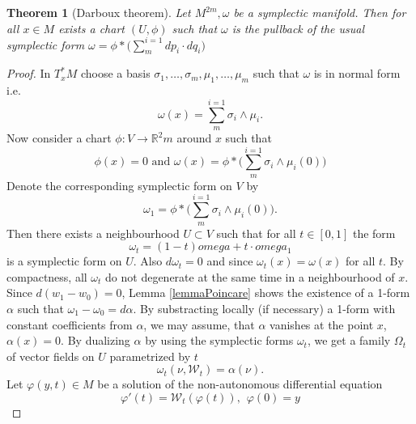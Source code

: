 \documentclass{article}
\newtheorem{theorem}{Theorem}
\theoremstyle{definition}
\begin{document}
\begin{theorem}[Darboux theorem]
    Let $M^{2m}, \omega$ be a symplectic manifold. Then for all $x \in M$ exists a chart $(U,\phi)$ such that $\omega$ is the pullback of the usual symplectic form $\omega = \phi*\Big(\sum_{m}^{i=1} dp_i \cdot dq_i \Big)$ 
\end{theorem}
\begin{proof}
    In $T^*_xM$ choose a basis $\sigma_1, \dots, \sigma_m, \mu_1, \dots, \mu_m$ such that $\omega$ is in normal form i.e.
    \begin{equation*}
        \omega(x) = \sum_{m}^{i=1} \sigma_i \wedge \mu_i.
    \end{equation*} 
    Now consider a chart $\phi : V \rightarrow \mathbb{R}^2m$ around $x$ such that 
    \begin{equation*}
        \phi(x) = 0 \text{ and } \omega(x) = \phi* \Big( \sum_{m}^{i=1} \sigma_i \wedge \mu_i(0) \Big)
    \end{equation*}
    Denote the corresponding symplectic form on $V$ by 
    \begin{equation*}
        \omega_1 = \phi* \Big( \sum_{m}^{i=1} \sigma_i \wedge \mu_i(0) \Big).
    \end{equation*}
    Then there exists a neighbourhood $U \subset V$ such that for all $t \in [0,1]$ the form 
    \begin{equation*}
        \omega_t = (1-t)omega + t\cdot omega_1
    \end{equation*}
    is a symplectic form on $U$. Also $d\omega_t = 0$ and since $\omega_t(x) = \omega(x)$ for all $t$. By compactness, all $\omega_t$ do not degenerate at the same time in a neighbourhood of $x$. Since $d(w_1 - w_0) = 0$, Lemma \ref{lemmaPoincare} shows the existence of a 1-form $\alpha$ such that $\omega_1 - \omega_0 = d\alpha$.
    By substracting locally (if necessary) a 1-form with constant coefficients from $\alpha$, we may assume, that $\alpha$ vanishes at the point $x$, $\alpha(x) = 0$.
    By dualizing $\alpha$ by using the symplectic forms $\omega_t$, we get a family $\Omega_t$ of vector fields on $U$ parametrized by $t$
    \begin{equation*}
        \omega_t(\nu, \mathcal{W}_t) = \alpha(\nu).
    \end{equation*}
    Let $\varphi(y,t) \in M$ be a solution of the non-autonomous differential equation
    \begin{equation*}
        \varphi'(t) = \mathcal{W}_t(\varphi(t)), \hspace{5pt} \varphi(0) = y
    \end{equation*}


\end{proof}
\end{document}
